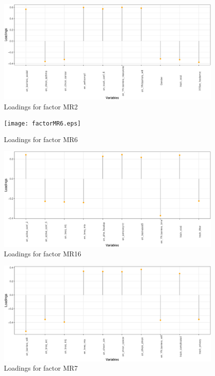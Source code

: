 \documentclass[preprint,12pt]{elsarticle}
\begin{document}
\begin{figure}[H]
\centering
  \includegraphics[width=1\linewidth]{factorMR2.eps}
  \caption{Loadings for factor MR2}
  \label{fig:8}
\end{figure}
\begin{figure}[H]
\centering
  \texttt{[image: factorMR6.eps]}
    \caption{Loadings for factor MR6}
  \label{fig:9}
\end{figure}
\begin{figure}[H]
\centering
  \includegraphics[width=1\linewidth]{factorMR16.eps}
    \caption{Loadings for factor MR16}
  \label{fig:10}
\end{figure}
\begin{figure}[H]
\centering
  \includegraphics[width=1\linewidth]{factorMR7.eps}
    \caption{Loadings for factor MR7}
  \label{fig:11}
\end{figure}
\end{document}

